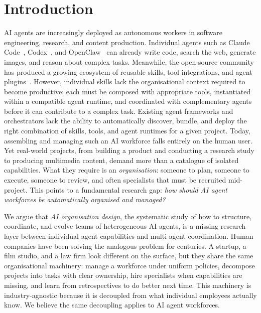 \documentclass[11pt,a4paper]{article}
\begin{document}
\section{Introduction}
\label{sec:introduction}

AI agents are increasingly deployed as autonomous workers in software engineering, research, and content production.  Individual agents such as Claude Code~\cite{anthropic2024claudecode}, Codex~\cite{openai2024codex}, and OpenClaw~\cite{openclaw2024} can already write code, search the web, generate images, and reason about complex tasks.  Meanwhile, the open-source community has produced a growing ecosystem of reusable skills, tool integrations, and agent plugins~\cite{mcpzoo2025, skillsmp}.  However, individual skills lack the organisational context required to become productive: each must be composed with appropriate tools, instantiated within a compatible agent runtime, and coordinated with complementary agents before it can contribute to a complex task.  Existing agent frameworks and orchestrators lack the ability to automatically discover, bundle, and deploy the right combination of skills, tools, and agent runtimes for a given project.  Today, assembling and managing such an AI workforce falls entirely on the human user.  Yet real-world projects, from building a product and conducting a research study to producing multimedia content, demand more than a catalogue of isolated capabilities.  What they require is an \emph{organisation}: someone to plan, someone to execute, someone to review, and often specialists that must be recruited mid-project.  This points to a fundamental research gap: \textit{how should AI agent workforces be automatically organised and managed?}

We argue that \emph{AI organisation design}, the systematic study of how to structure, coordinate, and evolve teams of heterogeneous AI agents, is a missing research layer between individual agent capabilities and multi-agent coordination.  Human companies have been solving the analogous problem for centuries.  A startup, a film studio, and a law firm look different on the surface, but they share the same organisational machinery: manage a workforce under uniform policies, decompose projects into tasks with clear ownership, hire specialists when capabilities are missing, and learn from retrospectives to do better next time.  This machinery is industry-agnostic because it is decoupled from what individual employees actually know.  We believe the same decoupling applies to AI agent workforces.
\end{document}
